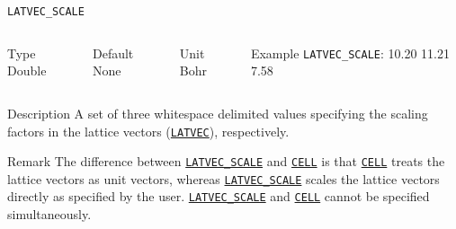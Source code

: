 \begin{frame}[allowframebreaks]{\texttt{LATVEC\_SCALE}} \label{LATVEC_SCALE}
\vspace*{-15pt}
\begin{columns}
\begin{block}{Type}
Double
\end{block}

\begin{block}{Default}
None
\end{block}

\begin{block}{Unit}
Bohr
\end{block}
    
\begin{block}{Example}
\texttt{LATVEC\_SCALE}: 10.20 11.21 7.58
\end{block}
\end{columns}

\vspace*{-2pt}
\begin{block}{Description}
A set of three whitespace delimited values specifying the scaling factors in the lattice vectors (\hyperlink{LATVEC}{\texttt{LATVEC}}), respectively.
\end{block}
\vspace*{-4pt}
\begin{block}{Remark}
    The difference between \hyperlink{LATVEC_SCALE}{\texttt{LATVEC\_SCALE}} and \hyperlink{CELL}{\texttt{CELL}} is that \hyperlink{CELL}{\texttt{CELL}} treats the lattice vectors as unit vectors, whereas \hyperlink{LATVEC_SCALE}{\texttt{LATVEC\_SCALE}} scales the lattice vectors directly as specified by the user. \hyperlink{LATVEC_SCALE}{\texttt{LATVEC\_SCALE}} and \hyperlink{CELL}{\texttt{CELL}} cannot be specified simultaneously.
\end{block}

\end{frame}



